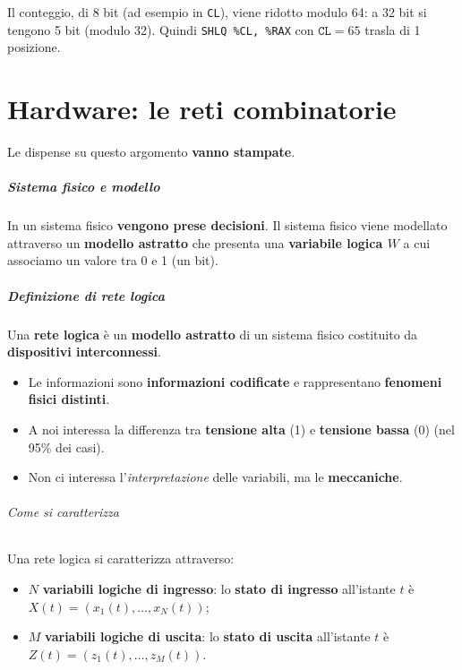 \documentclass[11pt,a4paper]{article}
\begin{document}
\begin{integrazione}
Il conteggio, di 8 bit (ad esempio in \texttt{CL}), viene ridotto modulo 64: a 32 bit si tengono 5 bit (modulo 32). Quindi \texttt{SHLQ \%CL, \%RAX} con $\texttt{CL}=65$ trasla di 1 posizione.
\end{integrazione}

\newpage
\part{Hardware: le reti combinatorie}

\begin{nota}
Le dispense su questo argomento \textbf{vanno stampate}.
\end{nota}

\subsubsection*{Sistema fisico e modello}

In un sistema fisico \textbf{vengono prese decisioni}. Il sistema fisico viene modellato attraverso un \textbf{modello astratto} che presenta una \textbf{variabile logica $W$} a cui associamo un valore tra 0 e 1 (un bit).

\subsubsection*{Definizione di rete logica}

Una \textbf{rete logica} è un \textbf{modello astratto} di un sistema fisico costituito da \textbf{dispositivi interconnessi}.

\begin{itemize}[leftmargin=*]
  \item Le informazioni sono \textbf{informazioni codificate} e rappresentano \textbf{fenomeni fisici distinti}.
  \item A noi interessa la differenza tra \textbf{tensione alta} (1) e \textbf{tensione bassa} (0) (nel 95\% dei casi).
  \item Non ci interessa l'\emph{interpretazione} delle variabili, ma le \textbf{meccaniche}.
\end{itemize}

\paragraph*{Come si caratterizza}

Una rete logica si caratterizza attraverso:
\begin{itemize}[leftmargin=*]
  \item $N$ \textbf{variabili logiche di ingresso}: lo \textbf{stato di ingresso} all'istante $t$ è $X(t)=(x_1(t),\ldots,x_N(t))$;
  \item $M$ \textbf{variabili logiche di uscita}: lo \textbf{stato di uscita} all'istante $t$ è $Z(t)=(z_1(t),\ldots,z_M(t))$.
\end{itemize}
\end{document}
